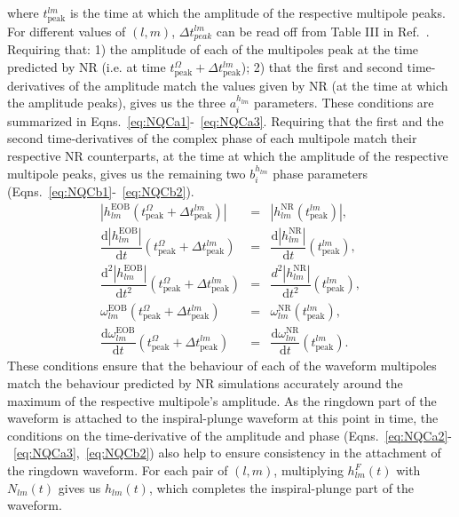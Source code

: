 \documentclass[aps,
prd,
amsmath,
amssymb,
twocolumn,
floatfix,
groupedaddress]{revtex4-1}
\newcommand{\D}{\mathrm{d}}
\newcommand{\peak}{\mathrm{peak}}
\newcommand{\EOB}{\mathrm{EOB}}
\newcommand{\NR}{\mathrm{NR}}
\begin{document}
where $t^{lm}_{\peak}$ is the time at which the amplitude of the respective multipole peaks. For different values of $(l,m)$, $\Delta t^{lm}_{peak}$ can be read off from Table III in Ref.~\citep{BuonannoEOBv2Main}. Requiring that: 1) the amplitude of each of the multipoles peak at the time predicted by NR (i.e. at time $t^{\Omega}_{\peak}+\Delta t^{lm}_{\peak}$); 2) that the first and second time-derivatives of the amplitude match the values given by NR (at the time at which the amplitude peaks), gives us the three $a_i^{h_{lm}}$ parameters.  These conditions are summarized in Eqns.~\eqref{eq:NQCa1}-~\eqref{eq:NQCa3}. Requiring that the first and the second time-derivatives of the complex phase of each multipole match their respective NR counterparts, at the time at which the amplitude of the respective multipole peaks, gives us the remaining two $b_i^{h_{lm}}$ phase parameters (Eqns.~\eqref{eq:NQCb1}-~\eqref{eq:NQCb2}).
\begin{subequations}
\begin{align}
\left| h^{\EOB}_{lm}(t^{\Omega}_{\peak}+\Delta t^{lm}_{\peak}) \right| &=& \left|h^{\NR}_{lm}(t^{lm}_{\peak})\right|\label{eq:NQCa1},\\
\dfrac{\D\left| h^{\EOB}_{lm} \right|}{\D t}(t^{\Omega}_{\peak}+\Delta t^{lm}_{\peak})  &=& \dfrac{\D\left|h^{\NR}_{lm}\right|}{\D t}(t^{lm}_{\peak})\label{eq:NQCa2},\\
\dfrac{\D^2\left| h^{\EOB}_{lm}\right|}{\D t^2}(t^{\Omega}_{\peak}+\Delta t^{lm}_{\peak})  &=& \dfrac{d^2\left|h^{\NR}_{lm}\right|}{\D t^2}(t^{lm}_{\peak})\label{eq:NQCa3},\\
\omega^{\EOB}_{lm}(t^{\Omega}_{\peak}+\Delta t^{lm}_{\peak}) &=& \omega^{\NR}_{lm}(t^{lm}_{\peak})\label{eq:NQCb1},\\
\dfrac{\D\omega^{\EOB}_{lm}}{\D t}(t^{\Omega}_{\peak}+\Delta t^{lm}_{\peak})  &=& \dfrac{\D\omega^{\NR}_{lm}}{\D t}(t^{lm}_{\peak})\label{eq:NQCb2}.
\end{align}
\end{subequations}
These conditions ensure that the behaviour of each of the waveform multipoles match the behaviour predicted by NR simulations accurately around the maximum of the respective multipole's amplitude. As the ringdown part of the waveform is attached to the inspiral-plunge waveform at this point in time, the conditions on the time-derivative of the amplitude and phase (Eqns.~\eqref{eq:NQCa2}-~\eqref{eq:NQCa3},~\eqref{eq:NQCb2}) also help to ensure consistency in the attachment of the ringdown waveform.
For each pair of $(l,m)$, multiplying $h^F_{lm}(t)$ with $N_{lm}(t)$ gives us $h_{lm}(t)$, which completes the inspiral-plunge part of the waveform.
\end{document}
